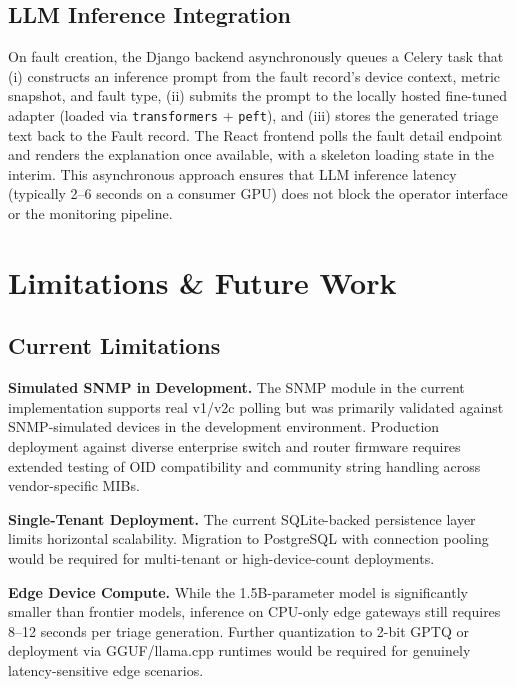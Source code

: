\documentclass[conference]{IEEEtran}
\begin{document}
\subsection{LLM Inference Integration}

On fault creation, the Django backend asynchronously queues a Celery task that (i) constructs an inference prompt from the fault record's device context, metric snapshot, and fault type, (ii) submits the prompt to the locally hosted fine-tuned adapter (loaded via \texttt{transformers} + \texttt{peft}), and (iii) stores the generated triage text back to the Fault record. The React frontend polls the fault detail endpoint and renders the explanation once available, with a skeleton loading state in the interim. This asynchronous approach ensures that LLM inference latency (typically 2--6 seconds on a consumer GPU) does not block the operator interface or the monitoring pipeline.

\section{Limitations \& Future Work}
\label{sec:limitations}

\subsection{Current Limitations}

\textbf{Simulated SNMP in Development.} The SNMP module in the current implementation supports real v1/v2c polling but was primarily validated against SNMP-simulated devices in the development environment. Production deployment against diverse enterprise switch and router firmware requires extended testing of OID compatibility and community string handling across vendor-specific MIBs.

\textbf{Single-Tenant Deployment.} The current SQLite-backed persistence layer limits horizontal scalability. Migration to PostgreSQL with connection pooling would be required for multi-tenant or high-device-count deployments.

\textbf{Edge Device Compute.} While the 1.5B-parameter model is significantly smaller than frontier models, inference on CPU-only edge gateways still requires 8--12 seconds per triage generation. Further quantization to 2-bit GPTQ or deployment via GGUF/llama.cpp runtimes would be required for genuinely latency-sensitive edge scenarios.
\end{document}
